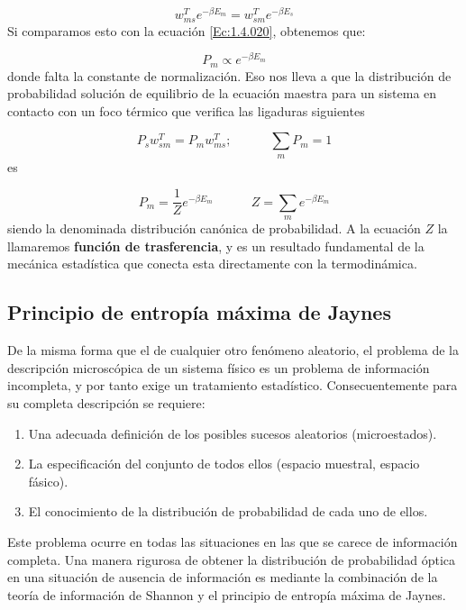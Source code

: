 \documentclass[12pt,a4paper]{article}
\numberwithin{equation}{section}
\numberwithin{figure}{section}
\newcommand{\tquad}{\quad \quad \quad}
\theoremstyle{definition}
\begin{document}
\begin{equation}
w^T_{ms} e^{- \beta E_m} = w_{sm}^T e^{- \beta E_s}
\end{equation}
Si comparamos esto con la ecuación \ref{Ec:1.4.020}, obtenemos que:

\begin{equation}
P_m \varpropto e^{-\beta E_m}
\end{equation}
donde falta la constante de normalización. Eso nos lleva a que la distribución de probabilidad solución de equilibrio de la ecuación maestra para un sistema en contacto con un foco térmico que verifica las ligaduras siguientes

\begin{equation}
P_s w_{sm}^T = P_m w_{ms}^T; \tquad \sum_m P_m =1
\end{equation}
es

\begin{equation}
P_m = \frac{1}{Z} e^{- \beta E_m } \tquad Z=\sum_m e^{-\beta E_m}
\end{equation}
siendo la denominada distribución canónica de probabilidad. A la ecuación $Z$ la llamaremos \textbf{función de trasferencia}, y es un resultado fundamental de la mecánica estadística que conecta esta directamente con la termodinámica.

\subsection{Principio de entropía máxima de Jaynes}

De la misma forma que el de cualquier otro fenómeno aleatorio, el problema de la descripción microscópica de un sistema físico es un problema de información incompleta, y por tanto exige un tratamiento estadístico. Consecuentemente para su completa descripción se requiere:

\begin{enumerate}
\item Una adecuada definición de los posibles sucesos aleatorios (microestados). 
\item La especificación del conjunto de todos ellos (espacio muestral, espacio fásico).
\item El conocimiento de la distribución de probabilidad de cada uno de ellos.
\end{enumerate}
Este problema ocurre en todas las situaciones en las que se carece de información completa. Una manera rigurosa de obtener la distribución de probabilidad óptica en una situación de ausencia de información es mediante la combinación de la teoría de información de Shannon y el principio de entropía máxima de Jaynes. \\
\end{document}
